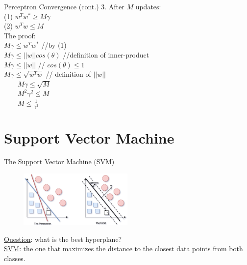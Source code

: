 \documentclass[aspectratio=1610]{beamer}
\begin{document}
\begin{frame}{Perceptron Convergence (cont.)}
    3. After $M$ updates:\\
    (1) $w^Tw^* \geq M\gamma$\\
    (2) $w^Tw \leq M$\\
    The proof:\\
    
    $M\gamma \leq w^Tw^*$ \quad \quad \quad \quad //by (1)\\[0.1cm]
    $ M\gamma \leq ||w||cos(\theta)$ \quad \quad //definition of inner-product\\[0.1cm]
    $ M\gamma \leq ||w||$ \quad \quad \quad \quad // $cos(\theta) \leq 1$\\[0.1cm]
    $M\gamma \leq \sqrt{w^Tw}$ \quad \quad \quad  // definition of $||w||$\\[0.1cm]
    $\quad \quad M\gamma \leq \sqrt{M}$\\[0.1cm]
    $\quad \quad M^2\gamma^2 \leq M$\\[0.1cm]
    $\quad \quad M \leq \frac{1}{\gamma^2}$
    
\end{frame}

\section{Support Vector Machine}
\begin{frame}{The Support Vector Machine (SVM)}
\begin{figure}[h!]
  \includegraphics[width=0.5\textwidth]{Screen Shot 2022-06-02 at 18.02.31.png}
\end{figure}
\underline{Question}: what is the best hyperplane?\\   
\underline{SVM}: the one that maximizes the distance to the closest data points from both classes.
    
\end{frame}
\end{document}
